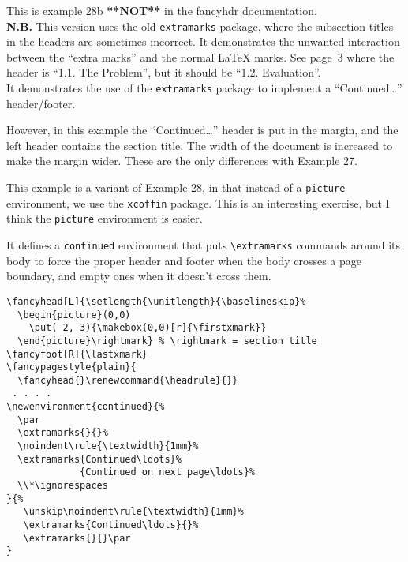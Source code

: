 \documentclass{report}
\begin{document}
\tableofcontents

\thispagestyle{plain}
\noindent
\begin{boxedminipage}{\textwidth}
\small
This is example 28b \textbf{**NOT**} in the fancyhdr documentation.
\\[1ex]
\textbf{N.B.} This version uses the old \texttt{extramarks} package, where the subsection titles in the headers are sometimes incorrect. It demonstrates the unwanted interaction between the ``extra marks'' and the normal \LaTeX{} marks. See page~3 where the header is ``1.1. The Problem'', but it should be ``1.2. Evaluation''.
\\[1ex]
It demonstrates the use of the \texttt{extramarks} package to implement
a ``Continued\ldots'' header/footer.

However, in this example the ``Continued\ldots'' header is put in the margin, and the left header contains the section title. The width of the document is increased to make the margin wider. These are the only differences with Example 27.

This example is a variant of Example 28, in that instead of a \texttt{picture} environment, we use the \texttt{xcoffin} package. This is an interesting exercise, but I think the \texttt{picture} environment is easier.

It defines a \texttt{continued} environment that puts \verb|\extramarks| commands around its body to force the proper header and footer when the body crosses a page boundary, and empty ones when it doesn't cross them.

\begin{verbatim}
\fancyhead[L]{\setlength{\unitlength}{\baselineskip}%
  \begin{picture}(0,0)
    \put(-2,-3){\makebox(0,0)[r]{\firstxmark}}
  \end{picture}\rightmark} % \rightmark = section title
\fancyfoot[R]{\lastxmark}
\fancypagestyle{plain}{
  \fancyhead{}\renewcommand{\headrule}{}}
 . . . .
\newenvironment{continued}{%
  \par
  \extramarks{}{}%
  \noindent\rule{\textwidth}{1mm}%
  \extramarks{Continued\ldots}%
             {Continued on next page\ldots}%
  \\*\ignorespaces
}{%
   \unskip\noindent\rule{\textwidth}{1mm}%
   \extramarks{Continued\ldots}{}%
   \extramarks{}{}\par
}
\end{verbatim}

\end{boxedminipage}
\end{document}
